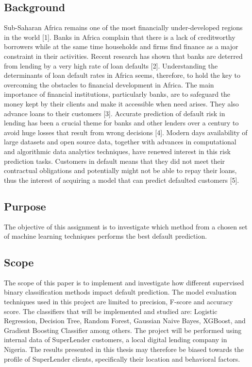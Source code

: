 \documentclass[a4paper]{article}
\begin{document}
\subsection{Background}
Sub-Saharan Africa remains one of the most financially under-developed regions in the world [1]. Banks in Africa complain that there is a lack of creditworthy borrowers while at the same time households and firms find finance as a major constraint in their activities. Recent research has shown that banks are deterred from lending by a very high rate of loan defaults [2]. Understanding the determinants of loan default rates in Africa seems, therefore, to hold the key to overcoming the obstacles to financial development in Africa. The main importance of financial institutions, particularly banks, are to safeguard the money kept by their clients and make it accessible when need arises. They also advance loans to their customers [3]. Accurate prediction of default risk in lending has been a crucial theme for banks and other lenders over a century to avoid huge losses that result from wrong decisions [4]. Modern days availability of large datasets and open source data, together with advances in computational and algorithmic data analytics techniques, have renewed interest in this risk prediction tasks. Customers in default means that they did not meet their contractual obligations and potentially might not be able to repay their loans, thus the interest of acquiring a model that can predict defaulted customers [5].

\subsection{Purpose}
The objective of this assignment is to investigate which method from a chosen set of machine learning techniques performs the best default prediction.  

\subsection{Scope}
The scope of this paper is to implement and investigate how different supervised binary classification methods impact default prediction. The model evaluation techniques used in this project are limited to precision, F-score and accuracy score. The classifiers that will be implemented and studied are: Logistic Regression, Decision Tree, Random Forest, Gaussian Naive Bayes, XGBoost, and Gradient Boosting Classifier among others. The project will be performed using internal data of SuperLender customers, a local digital lending company in Nigeria. The results presented in this thesis may therefore be biased towards the profile of SuperLender clients, specifically their location and behavioral factors.
\end{document}
